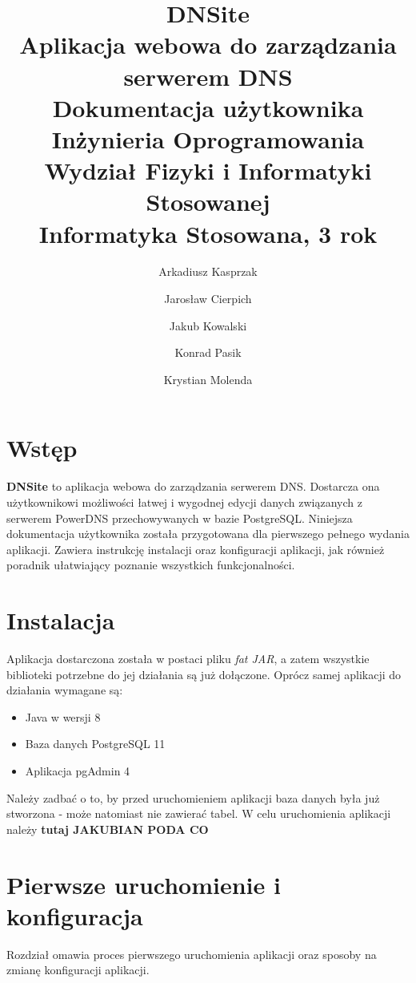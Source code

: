 \documentclass[12pt] {article}
\title 
{	
	{
		\textbf{\textsf{\Huge\color{orange}DNS\color{white}ite}} \\ [0.1in]
		\normalfont\sffamily\LARGE\color{white}
		Aplikacja webowa do zarządzania serwerem DNS \\[0.1in]
		Dokumentacja użytkownika\\ [1.5in]
		\large 
		Inżynieria Oprogramowania \\
		Wydział Fizyki i Informatyki Stosowanej \\
		Informatyka Stosowana, 3 rok \\
	}
}
\author 
{
	\color{white}\normalfont\sffamily Arkadiusz Kasprzak \and 
	\color{white}\normalfont\sffamily Jarosław Cierpich \and 
	\color{white}\normalfont\sffamily Jakub Kowalski \and 
	\color{white}\normalfont\sffamily Konrad Pasik \and 
	\color{white}\normalfont\sffamily Krystian Molenda
}
\date{}
\begin{document}
\pagecolor{backgroundColor}
\maketitle
\thispagestyle{empty}


\newpage
\clearpage
{}
\pagecolor{white}

\tableofcontents

\newpage 

\section{Wstęp}
\textbf{DNSite} to aplikacja webowa do zarządzania serwerem DNS. Dostarcza ona użytkownikowi możliwości łatwej i wygodnej edycji danych związanych z serwerem PowerDNS przechowywanych w bazie PostgreSQL.\newline
Niniejsza dokumentacja użytkownika została przygotowana dla pierwszego pełnego wydania aplikacji. Zawiera instrukcję instalacji oraz konfiguracji aplikacji, jak również poradnik ułatwiający poznanie wszystkich funkcjonalności.

\section{Instalacja}
Aplikacja dostarczona została w postaci pliku \emph{fat JAR}, a zatem wszystkie biblioteki potrzebne do jej działania są już dołączone. Oprócz samej aplikacji do działania wymagane są:
\begin{itemize}
\item Java w wersji 8
\item Baza danych PostgreSQL 11
\item Aplikacja pgAdmin 4
\end{itemize}
Należy zadbać o to, by przed uruchomieniem aplikacji baza danych była już stworzona - może natomiast nie zawierać tabel.
W celu uruchomienia aplikacji należy \textbf{tutaj JAKUBIAN PODA CO}


\section{Pierwsze uruchomienie i konfiguracja}
Rozdział omawia proces pierwszego uruchomienia aplikacji oraz sposoby na zmianę konfiguracji aplikacji.
\end{document}
